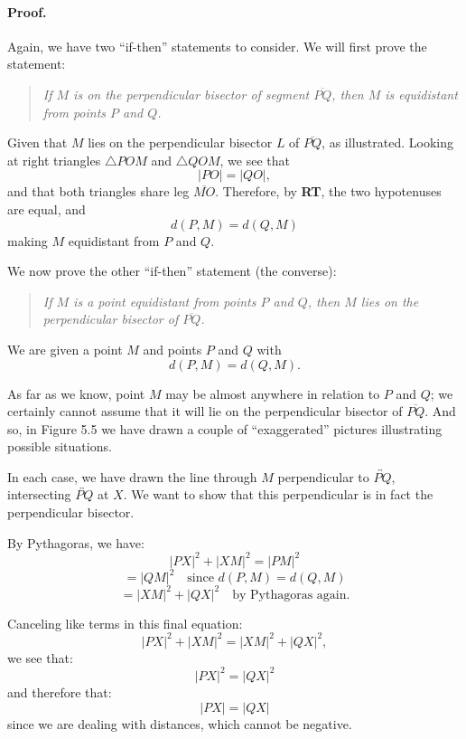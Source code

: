 \documentclass[12pt]{book} %
\begin{document}
\paragraph{Proof.}
Again, we have two ``if-then'' statements to consider. We will first prove the statement:

\begin{quote}
\textit{If $M$ is on the perpendicular bisector of segment $\overline{PQ}$, then $M$ is equidistant from points $P$ and $Q$.}
\end{quote}

Given that $M$ lies on the perpendicular bisector $L$ of $\overline{PQ}$, as illustrated. Looking at right triangles $\triangle POM$ and $\triangle QOM$, we see that
\[
|PO|=|QO|,
\]
and that both triangles share leg $\overline{MO}$. Therefore, by \textbf{RT}, the two hypotenuses are equal, and
\[
d(P,M)=d(Q,M)
\]
making $M$ equidistant from $P$ and $Q$.


We now prove the other ``if-then'' statement (the converse):

\begin{quote}
\textit{If $M$ is a point equidistant from points $P$ and $Q$, then $M$ lies on the perpendicular bisector of $\overline{PQ}$.}
\end{quote}

We are given a point $M$ and points $P$ and $Q$ with
\[
d(P,M)=d(Q,M).
\]

As far as we know, point $M$ may be almost anywhere in relation to $P$ and $Q$; we certainly cannot assume that it will lie on the perpendicular bisector of $\overline{PQ}$. And so, in Figure 5.5 we have drawn a couple of ``exaggerated'' pictures illustrating possible situations.


In each case, we have drawn the line through $M$ perpendicular to $\overleftrightarrow{PQ}$, intersecting $\overleftrightarrow{PQ}$ at $X$. We want to show that this perpendicular is in fact the perpendicular bisector.

By Pythagoras, we have:
\[
|PX|^2+|XM|^2=|PM|^2
\]
\[
=|QM|^2 \quad \text{since } d(P,M)=d(Q,M)
\]
\[
=|XM|^2+|QX|^2 \quad \text{by Pythagoras again.}
\]

Canceling like terms in this final equation:
\[
|PX|^2+|XM|^2=|XM|^2+|QX|^2,
\]
we see that:
\[
|PX|^2=|QX|^2
\]
and therefore that:
\[
|PX|=|QX|
\]
since we are dealing with distances, which cannot be negative.
\end{document}
